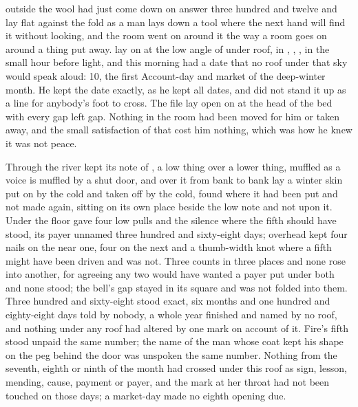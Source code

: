 
 outside the wool had just come down on answer three hundred and twelve and lay flat against the fold as a man lays down a tool where the next hand will find it without looking, and the room went on around it the way a room goes on around a thing put away.  lay on  at the low angle of  under  roof, in , , , in the small hour before light, and this morning had a date that no roof under that sky would speak aloud:  10, the first Account-day and market of the deep-winter month. He kept the date exactly, as he kept all dates, and did not stand it up as a line for anybody's foot to cross. The file lay open on  at the head of the bed with every gap left gap. Nothing in the room had been moved for him or taken away, and the small satisfaction of that cost him nothing, which was how he knew it was not peace.

Through  the river kept its note of , a low thing over a lower thing, muffled as a voice is muffled by a shut door, and over it from bank to bank lay a winter skin put on by the cold and taken off by the cold, found where it had been put and not made again, sitting on its own place beside the low note and not upon it. Under the floor  gave four low pulls and the silence where the fifth should have stood, its payer unnamed three hundred and sixty-eight days; overhead  kept four nails on the near one, four on the next and a thumb-width knot where a fifth might have been driven and was not. Three counts in three places and none rose into another, for agreeing any two would have wanted a payer put under both and none stood; the bell's gap stayed in its square and was not folded into them. Three hundred and sixty-eight stood exact, six months and one hundred and eighty-eight days told by nobody, a whole year finished and named by no roof, and nothing under any roof had altered by one mark on account of it. Fire's fifth stood unpaid the same number; the name of the man whose coat kept his shape on the peg behind the door was unspoken the same number. Nothing from the seventh, eighth or ninth of the month had crossed under this roof as sign, lesson, mending, cause, payment or payer, and the mark at her throat had not been touched on those days; a market-day made no eighth opening due.

